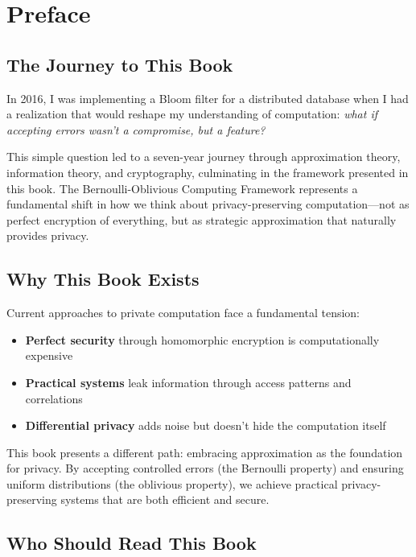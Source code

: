 \chapter*{Preface}

\section*{The Journey to This Book}

In 2016, I was implementing a Bloom filter for a distributed database when I had a realization that would reshape my understanding of computation: \emph{what if accepting errors wasn't a compromise, but a feature?}

This simple question led to a seven-year journey through approximation theory, information theory, and cryptography, culminating in the framework presented in this book. The Bernoulli-Oblivious Computing Framework represents a fundamental shift in how we think about privacy-preserving computation—not as perfect encryption of everything, but as strategic approximation that naturally provides privacy.

\section*{Why This Book Exists}

Current approaches to private computation face a fundamental tension:
\begin{itemize}
    \item \textbf{Perfect security} through homomorphic encryption is computationally expensive
    \item \textbf{Practical systems} leak information through access patterns and correlations
    \item \textbf{Differential privacy} adds noise but doesn't hide the computation itself
\end{itemize}

This book presents a different path: embracing approximation as the foundation for privacy. By accepting controlled errors (the Bernoulli property) and ensuring uniform distributions (the oblivious property), we achieve practical privacy-preserving systems that are both efficient and secure.

\section*{Who Should Read This Book}

